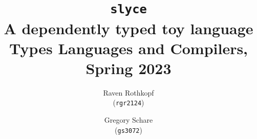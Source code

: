 \documentclass[12pt]{article}
\begin{document}
\title{\texttt{slyce}\\
    \normalsize A dependently typed toy language \\
    Types Languages and Compilers, Spring 2023}

\author{Raven Rothkopf\\ \small (\texttt{rgr2124})
    \and 
    Gregory Schare\\ \small (\texttt{gs3072})}

\maketitle
\tableofcontents\newpage




\end{document}
